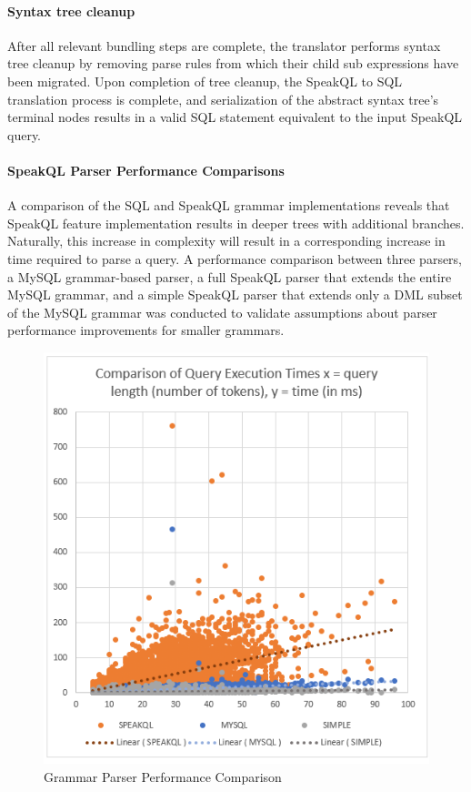 
\paragraph{Syntax tree cleanup}

After all relevant bundling steps are complete, the translator performs syntax tree cleanup by removing parse rules from which their child sub expressions have been migrated. Upon completion of tree cleanup, the SpeakQL to SQL translation process is complete, and serialization of the abstract syntax tree's terminal nodes results in a valid SQL statement equivalent to the input SpeakQL query.


\paragraph{\textbf{SpeakQL Parser Performance Comparisons}}
A comparison of the SQL and SpeakQL grammar implementations reveals that SpeakQL feature implementation results in deeper trees with additional branches. Naturally, this increase in complexity will result in a corresponding increase in time required to parse a query. A performance comparison between three parsers, a MySQL grammar-based parser, a full SpeakQL parser that extends the entire MySQL grammar, and a simple SpeakQL parser that extends only a DML subset of the MySQL grammar was conducted to validate assumptions about parser performance improvements for smaller grammars. 

\begin{figure}
    \centering
    \includegraphics[width=\linewidth]{figures/parser-performance-plot.png}
    \caption{Grammar Parser Performance Comparison}
    \label{fig:parserperformanceplot}
\end{figure}

